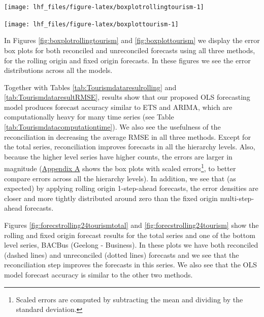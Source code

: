 \documentclass[11pt,a4paper,]{article}
\let\origfigure\figure
\let\endorigfigure\endfigure
\renewenvironment{figure}[1][2] {
    \expandafter\origfigure\expandafter[!htbp]
} {
    \endorigfigure
}
\begin{document}
\begin{figure}

{\centering \texttt{[image: lhf\_files/figure-latex/boxplotrollingtourism-1]} 

}

\caption{Box plots of rolling origin forecast errors from reconciled and unreconciled ETS, ARIMA and OLS methods at each hierarchical level for tourism demand.}\label{fig:boxplotrollingtourism}
\end{figure}

\begin{figure}

{\centering \texttt{[image: lhf\_files/figure-latex/boxplottourism-1]} 

}

\caption{Box plots of fixed origin forecast errors for reconciled and unreconciled ETS, ARIMA and OLS methods at each hierarchical level for tourism demand.}\label{fig:boxplottourism}
\end{figure}

In Figures \ref{fig:boxplotrollingtourism} and \ref{fig:boxplottourism} we display the error box plots for both reconciled and unreconciled forecasts using all three methods, for the rolling origin and fixed origin forecasts. In these figures we see the error distributions across all the models.

Together with Tables \ref{tab:Tourismdataresulrolling} and \ref{tab:TourismdataresultRMSE}, results show that our proposed OLS forecasting model produces forecast accuracy similar to ETS and ARIMA, which are computationally heavy for many time series (see Table \ref{tab:Tourismdatacomputationtime}). We also see the usefulness of the reconciliation in decreasing the average RMSE in all three methods. Except for the total series, reconciliation improves forecasts in all the hierarchy levels. Also, because the higher level series have higher counts, the errors are larger in magnitude (\protect\hyperlink{appendixA}{Appendix A} shows the box plots with scaled errors\footnote{Scaled errors are computed by subtracting the mean and dividing by the standard deviation.}, to better compare errors across all the hierarchy levels). In addition, we see that (as expected) by applying rolling origin 1-step-ahead forecasts, the error densities are closer and more tightly distributed around zero than the fixed origin multi-step-ahead forecasts.

Figures \ref{fig:forecstrolling24tourismtotal} and \ref{fig:forecstrolling24tourism} show the rolling and fixed origin forecast results for the total series and one of the bottom level series, BACBus (Geelong - Business). In these plots we have both reconciled (dashed lines) and unreconciled (dotted lines) forecasts and we see that the reconciliation step improves the forecasts in this series. We also see that the OLS model forecast accuracy is similar to the other two methods.
\end{document}
